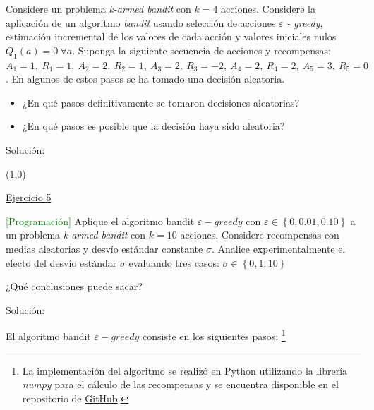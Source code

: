 \documentclass[12pt]{article}
\newlength\tindent
\renewcommand{\indent}{\hspace*{\tindent}}
\begin{document}
    Considere un problema \textit{k-armed bandit} con $k = 4$ acciones.
    Considere la aplicación de un algoritmo \textit{bandit} usando selección de acciones $\varepsilon$ \textit{- greedy}, estimación incremental de los valores de cada acción y valores iniciales nulos $Q_{1}(a) = 0\ \forall a$.
    Suponga la siguiente secuencia de acciones y recompensas: $A_{1}=1,\ R_{1}=1,\ A_{2}=2,\ R_{2}=1,\ A_{3}=2,\ R_{3}=-2,\ A_{4}=2,\ R_{4}=2,\ A_{5}=3,\ R_{5}=0$.
    En algunos de estos pasos se ha tomado una decisión aleatoria.

    \begin{itemize}
        \item ¿En qué pasos definitivamente se tomaron decisiones aleatorias?
        \item ¿En qué pasos es posible que la decisión haya sido aleatoria?
    \end{itemize}

    \indent\underline{Solución:}

    \lipsum[10]

    \line(1,0){\textwidth}


    \indent\underline{Ejercicio 5}

    \textcolor{green}{[Programación]} Aplique el algoritmo bandit $\varepsilon-greedy$ con $\varepsilon \in \left\{ 0, 0.01, 0.10 \right\}$ a un problema \textit{k-armed bandit} con $k=10$ acciones.
    Considere recompensas con medias aleatorias y desvío estándar constante $\sigma$.
    Analice experimentalmente el efecto del desvío estándar $\sigma$ evaluando tres casos: $\sigma \in \left\{ 0, 1, 10 \right\}$

    ¿Qué conclusiones puede sacar?

    \indent\underline{Solución:}

    El algoritmo bandit $\varepsilon-greedy$ consiste en los siguientes pasos\footnotemark:
    \footnote{La implementación del algoritmo se realizó en Python utilizando la librería \textit{numpy} para el cálculo de las recompensas y se encuentra disponible en el repositorio de \href{https://google.com}{GitHub}.}
\end{document}

